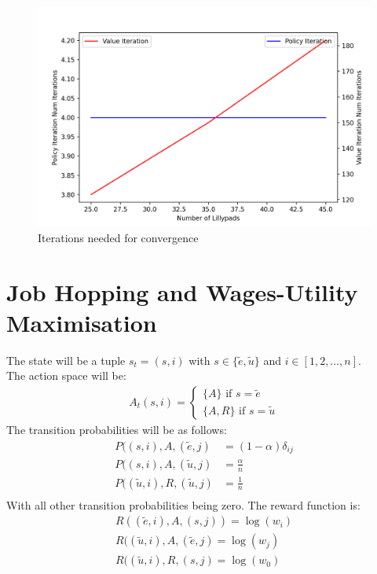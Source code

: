 \documentclass{article}[12pt]
\begin{document}
\begin{figure}
  \includegraphics[width=\linewidth]{CovergenceSpeed.png}
  \caption{Iterations needed for convergence}
  \label{fig:llp3}
\end{figure}

\section{Job Hopping and Wages-Utility Maximisation}
The state will be a tuple $s_t = (s,i)$ with $s\in\{\tilde{e}, \tilde{u}\}$ and $i \in [1,2,\ldots,n]$.\\
The action space will be:
\begin{align*}
A_t(s,i) = \begin{cases} \{A\} \text{ if $s = \tilde{e}$} \\ \{A, R\} \text{ if $s=\tilde{u}$}\end{cases}
\end{align*}
The transition probabilities will be as follows:
\begin{align*}
P((s,i), A, (\tilde{e},j) &= (1-\alpha)\delta_{ij}\\
P((s,i), A, (\tilde{u},j) &= \frac{\alpha}{n}\\
P((\tilde{u},i), R, (\tilde{u},j) &= \frac{1}{n}\\
\end{align*}
With all other transition probabilities being zero. The reward function is:
\begin{align*}
R((\tilde{e},i), A, (s,j)) = \log(w_i)\\
R((\tilde{u},i), A, (\tilde{e},j) = \log(w_j)\\
R((\tilde{u},i), R, (s,j) = \log(w_0)\\
\end{align*}
\end{document}
